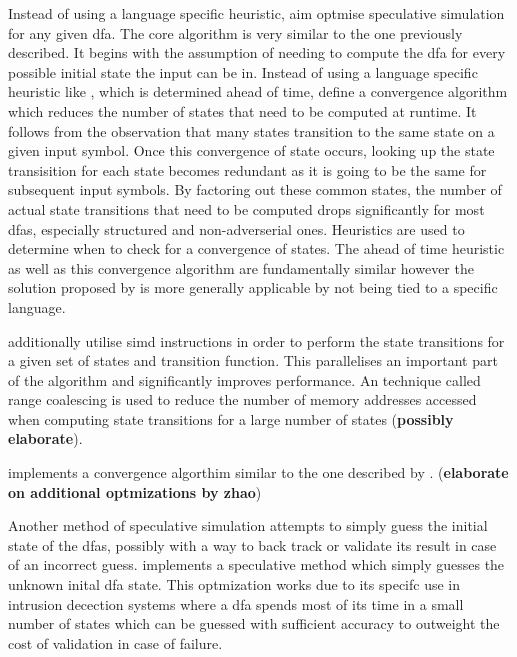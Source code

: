 Instead of using a language specific heuristic,
\cite{mytkowicz_data-parallel_2014} aim optmise speculative simulation for
any given \gls{dfa}. The core algorithm is very similar to the one previously
described. It begins with the assumption of needing to compute the \gls{dfa} for
every possible initial state the input can be in. Instead of using a language
specific heuristic like \cite{barenghi_parallel_2015}, which is determined ahead
of time, \cite{mytkowicz_data-parallel_2014} define a convergence algorithm
which reduces the number of states that need to be computed at runtime. It
follows from the observation that many states transition to the same state on
a given input symbol. Once this convergence of state occurs, looking up the
state transisition for each state becomes redundant as it is going to be the
same for subsequent input symbols. By factoring out these common states, the
number of actual state transitions that need to be computed drops significantly
for most \gls{dfa}s, especially structured and non-adverserial ones. Heuristics
are used to determine when to check for a  convergence of states. The ahead of
time heuristic as well as this convergence algorithm are fundamentally similar
however the solution proposed by \cite{mytkowicz_data-parallel_2014} is more
generally applicable by not being tied to a specific language.

\cite{mytkowicz_data-parallel_2014} additionally utilise \gls{simd} instructions
in order to perform the state transitions for a given set of states and
transition function. This parallelises an important part of the algorithm and
significantly improves performance. An technique called range coalescing is
used to reduce the number of memory addresses accessed when computing state
transitions for a large number of states (\textbf{possibly elaborate}).

\cite{zhao_--fly_2015} implements a convergence algorthim similar to the
one described by  \cite{mytkowicz_data-parallel_2014}. (\textbf{elaborate on
additional optmizations by zhao})

Another method of speculative simulation attempts to simply guess the initial
state of the \gls{dfa}s, possibly with a way to back track or validate
its result in case of an incorrect guess. \cite{luchaup_multi-byte_2009,
luchaup_speculative_2011} implements a speculative method which simply guesses
the unknown inital \gls{dfa} state. This optmization works due to its specifc
use in intrusion decection systems where a \gls{dfa} spends most of its time
in a small number of states which can be guessed with sufficient accuracy to
outweight the cost of validation in case of failure.

